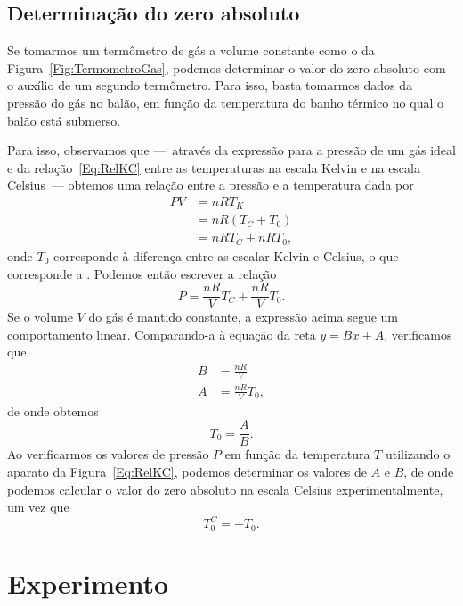 \subsection{Determinação do zero absoluto}

Se tomarmos um termômetro de gás a volume constante como o da Figura~\ref{Fig:TermometroGas}, podemos determinar o valor do zero absoluto com o auxílio de um segundo termômetro. Para isso, basta tomarmos dados da pressão do gás no balão, em função da temperatura do banho térmico no qual o balão está submerso.

Para isso, observamos que ---~através da expressão para a pressão de um gás ideal e da relação~\eqref{Eq:RelKC} entre as temperaturas na escala Kelvin e na escala Celsius~--- obtemos uma relação entre a pressão e a temperatura dada por
\begin{align}
    PV &= nRT_K \\
    &= nR(T_C + T_0) \\
    &= nRT_C + nRT_0,
\end{align}
%
onde $T_0$ corresponde à diferença entre as escalar Kelvin e Celsius, o que corresponde a . Podemos então escrever a relação
\begin{equation}
    P = \frac{nR}{V}T_C + \frac{nR}{V}T_0.
\end{equation}
%
Se o volume $V$ do gás é mantido constante, a expressão acima segue um comportamento linear. Comparando-a à equação da reta $y = Bx + A$, verificamos que
\begin{align}
    B &= \frac{nR}{V} \\
    A &= \frac{nR}{V}T_0,
\end{align}
%
de onde obtemos
\begin{equation}\label{Eq:EqRazaoABZeroAbs1}
    T_0 = \frac{A}{B}.
\end{equation}
%
Ao verificarmos os valores de pressão $P$ em função da temperatura $T$ utilizando o aparato da Figura~\ref{Eq:RelKC}, podemos determinar os valores de $A$ e $B$, de onde podemos calcular o valor do zero absoluto na escala Celsius experimentalmente, um vez que 
\begin{equation}\label{Eq:EqRazaoABZeroAbs2}
    T_0^C = - T_0.
\end{equation}

\section{Experimento}

